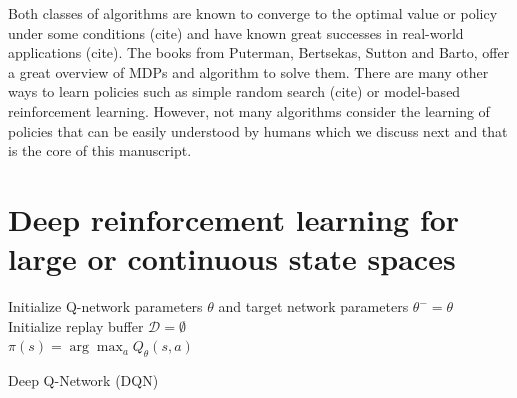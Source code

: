 Both classes of algorithms are known to converge to the optimal value or policy under some conditions (cite) and have known great successes in real-world applications (cite).
The books from Puterman, Bertsekas, Sutton and Barto, offer a great overview of MDPs and algorithm to solve them.
There are many other ways to learn policies such as simple random search (cite) or model-based reinforcement learning. 
However, not many algorithms consider the learning of policies that can be easily understood by humans which we discuss next and that is the core of this manuscript.


\section{Deep reinforcement learning for large or continuous state spaces}
\begin{algorithm}
    Initialize Q-network parameters $\theta$ and target network parameters $\theta^- = \theta$ \\
    Initialize replay buffer $\mathcal{D} = \emptyset$ \\
    $\pi(s) = \arg\max_a Q_\theta(s,a)$ 
    \caption{Deep Q-Network (DQN)}\label{alg:dqn}
\end{algorithm}


